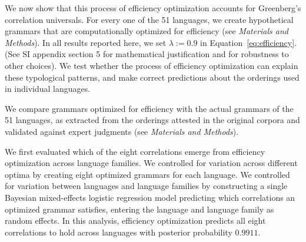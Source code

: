 \documentclass[9pt,twocolumn,twoside,lineno]{pnas-new}
\begin{document}
We now show that this process of efficiency optimization accounts for Greenberg's correlation universals. %
For every one of the 51 languages, we create hypothetical grammars that are computationally optimized for efficiency (see \textit{Materials and Methods}).
In all results reported here, we set $\lambda := 0.9$ in Equation~\ref{eq:efficiency}.
(See SI appendix section 5 for mathematical justification and for robustness to other choices).
We test whether the process of efficiency optimization can explain these typological patterns, and make correct predictions about the orderings used in individual languages. %





We compare grammars optimized for efficiency with the actual grammars of the 51 languages, as extracted from the orderings attested in the original corpora and validated against expert judgments (see \textit{Materials and Methods}).

We first evaluated which of the eight correlations emerge from efficiency optimization across language families.
We controlled for variation across different optima by creating eight optimized grammars for each language.
We controlled for variation between languages and language families by constructing a single Bayesian mixed-effects logistic regression model predicting which correlations an optimized grammar satisfies, entering the language and language family as random effects.
In this analysis, efficiency optimization predicts all eight correlations to hold across languages with posterior probability $0.9911$. 
\end{document}
